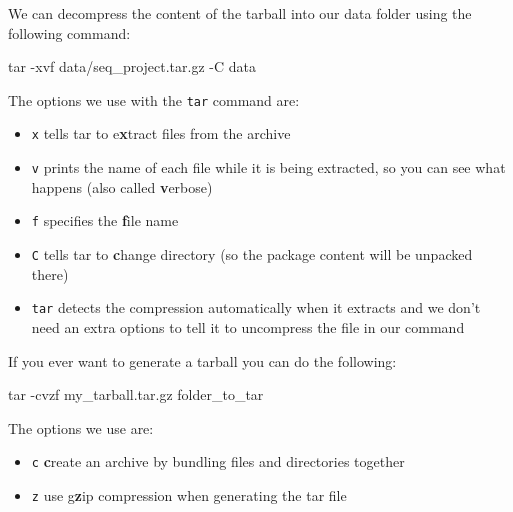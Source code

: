 \documentclass[
  letterpaper,
  DIV=11,
  numbers=noendperiod]{scrreprt}
\newenvironment{Shaded}{}{}
\newcommand{\AttributeTok}[1]{\textcolor[rgb]{0.84,0.23,0.29}{#1}}
\newcommand{\FunctionTok}[1]{\textcolor[rgb]{0.44,0.26,0.76}{#1}}
\newcommand{\NormalTok}[1]{\textcolor[rgb]{0.14,0.16,0.18}{#1}}
\providecommand{\tightlist}{%
  \setlength{\itemsep}{0pt}\setlength{\parskip}{0pt}}
\begin{document}
We can decompress the content of the tarball into our data folder using
the following command:

\begin{Shaded}
\begin{Highlighting}[]
\FunctionTok{tar} \AttributeTok{{-}xvf}\NormalTok{ data/seq\_project.tar.gz }\AttributeTok{{-}C}\NormalTok{ data}
\end{Highlighting}
\end{Shaded}

The options we use with the \texttt{tar} command are:

\begin{itemize}
\tightlist
\item
  \texttt{x} tells tar to e\textbf{x}tract files from the archive
\item
  \texttt{v} prints the name of each file while it is being extracted,
  so you can see what happens (also called \textbf{v}erbose)
\item
  \texttt{f} specifies the \textbf{f}ile name
\item
  \texttt{C} tells tar to \textbf{c}hange directory (so the package
  content will be unpacked there)
\item
  \texttt{tar} detects the compression automatically when it extracts
  and we don't need an extra options to tell it to uncompress the file
  in our command
\end{itemize}

\begin{tcolorbox}[enhanced jigsaw, coltitle=black, breakable, titlerule=0mm, colback=white, rightrule=.15mm, bottomrule=.15mm, toprule=.15mm, colframe=quarto-callout-tip-color-frame, colbacktitle=quarto-callout-tip-color!10!white, bottomtitle=1mm, opacitybacktitle=0.6, toptitle=1mm, leftrule=.75mm, arc=.35mm, title=\textcolor{quarto-callout-tip-color}{\faLightbulb}\hspace{0.5em}{Tip: How to generate a tarball (optional)}, left=2mm, opacityback=0]

If you ever want to generate a tarball you can do the following:

\begin{Shaded}
\begin{Highlighting}[]
\FunctionTok{tar} \AttributeTok{{-}cvzf}\NormalTok{ my\_tarball.tar.gz folder\_to\_tar}
\end{Highlighting}
\end{Shaded}

The options we use are:

\begin{itemize}
\tightlist
\item
  \texttt{c} \textbf{c}reate an archive by bundling files and
  directories together
\item
  \texttt{z} use g\textbf{z}ip compression when generating the tar file
\end{itemize}

\end{tcolorbox}
\end{document}
